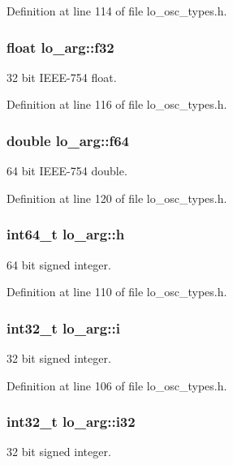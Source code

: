 Definition at line 114 of file lo\+\_\+osc\+\_\+types.\+h.

\hypertarget{unionlo__arg_a27ae2540e5e98e85826ccb7350b2ab20}{
\subsubsection[{f32}]{\setlength{\rightskip}{0pt plus 5cm}float lo\+\_\+arg\+::f32}}\label{unionlo__arg_a27ae2540e5e98e85826ccb7350b2ab20}
32 bit I\+E\+E\+E-\/754 float. 

Definition at line 116 of file lo\+\_\+osc\+\_\+types.\+h.

\hypertarget{unionlo__arg_abf90442900450bb63d8d9bb4e60af4ee}{
\subsubsection[{f64}]{\setlength{\rightskip}{0pt plus 5cm}double lo\+\_\+arg\+::f64}}\label{unionlo__arg_abf90442900450bb63d8d9bb4e60af4ee}
64 bit I\+E\+E\+E-\/754 double. 

Definition at line 120 of file lo\+\_\+osc\+\_\+types.\+h.

\hypertarget{unionlo__arg_a1773bb0e69aa3b137ddc26044334b2b4}{
\subsubsection[{h}]{\setlength{\rightskip}{0pt plus 5cm}int64\+\_\+t lo\+\_\+arg\+::h}}\label{unionlo__arg_a1773bb0e69aa3b137ddc26044334b2b4}
64 bit signed integer. 

Definition at line 110 of file lo\+\_\+osc\+\_\+types.\+h.

\hypertarget{unionlo__arg_a7eefb9548603ff68b4fbd4c4d41c648b}{
\subsubsection[{i}]{\setlength{\rightskip}{0pt plus 5cm}int32\+\_\+t lo\+\_\+arg\+::i}}\label{unionlo__arg_a7eefb9548603ff68b4fbd4c4d41c648b}
32 bit signed integer. 

Definition at line 106 of file lo\+\_\+osc\+\_\+types.\+h.

\hypertarget{unionlo__arg_a07e800463dc4ec5066b01033457ca018}{
\subsubsection[{i32}]{\setlength{\rightskip}{0pt plus 5cm}int32\+\_\+t lo\+\_\+arg\+::i32}}\label{unionlo__arg_a07e800463dc4ec5066b01033457ca018}
32 bit signed integer. 

